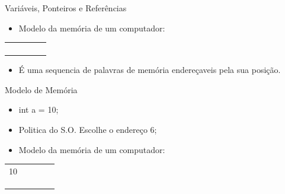 \documentclass[12pt,table,xcolor={dvipsnames}]{beamer}
\begin{document}
\begin{frame}[fragile]{Variáveis, Ponteiros e Referências}
\begin{itemize}
\item Modelo da memória de um computador:
\end{itemize}
{
\begin{tabular}{ |p{1cm}|p{1cm}|p{1cm}|p{1cm}|p{1cm}| }
\hline
& & & & \\ \hline
& & & & \\ \hline
& & & & \\ \hline
& & & & \\ \hline
& & & & \\ \hline
\end{tabular}
}
\begin{itemize}
\item É uma sequencia de palavras de memória endereçaveis pela sua posição.
\end{itemize}
\end{frame}

\begin{frame}[fragile]{Modelo de Memória}
\begin{itemize}
\item int a = 10;
\item Politica do S.O. Escolhe o endereço 6;
\item Modelo da memória de um computador:
\end{itemize}
{
\begin{tabular}{ |p{1cm}|p{1cm}|p{1cm}|p{1cm}|p{1cm}| }
\hline
& & & & \\ \hline
10 & & & & \\ \hline
& & & & \\ \hline
& & & & \\ \hline
& & & & \\ \hline
\end{tabular}
}
\end{frame}
\end{document}
